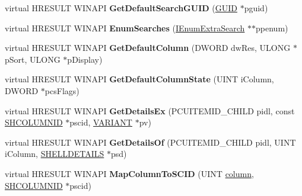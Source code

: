 \begin{DoxyCompactItemize}
\item 
\mbox{\label{class_c_network_connections_a2eb22534117599700051c3a348f8a81f}} 
virtual H\+R\+E\+S\+U\+LT W\+I\+N\+A\+PI {\bfseries Get\+Default\+Search\+G\+U\+ID} (\hyperlink{interface_g_u_i_d}{G\+U\+ID} $\ast$pguid)
\item 
\mbox{\label{class_c_network_connections_acb6d8d99a9da6bae3c8c315f125d2248}} 
virtual H\+R\+E\+S\+U\+LT W\+I\+N\+A\+PI {\bfseries Enum\+Searches} (\hyperlink{interface_i_enum_extra_search}{I\+Enum\+Extra\+Search} $\ast$$\ast$ppenum)
\item 
\mbox{\label{class_c_network_connections_a2db491cecdedf3c137fb352b8458e332}} 
virtual H\+R\+E\+S\+U\+LT W\+I\+N\+A\+PI {\bfseries Get\+Default\+Column} (D\+W\+O\+RD dw\+Res, U\+L\+O\+NG $\ast$p\+Sort, U\+L\+O\+NG $\ast$p\+Display)
\item 
\mbox{\label{class_c_network_connections_ad491907813d94ab27740f8f11208d696}} 
virtual H\+R\+E\+S\+U\+LT W\+I\+N\+A\+PI {\bfseries Get\+Default\+Column\+State} (U\+I\+NT i\+Column, D\+W\+O\+RD $\ast$pcs\+Flags)
\item 
\mbox{\label{class_c_network_connections_a1f79a0bfd284303124504a3eb76a4670}} 
virtual H\+R\+E\+S\+U\+LT W\+I\+N\+A\+PI {\bfseries Get\+Details\+Ex} (P\+C\+U\+I\+T\+E\+M\+I\+D\+\_\+\+C\+H\+I\+LD pidl, const \hyperlink{struct_i_shell_folder2_1_1_s_h_c_o_l_u_m_n_i_d}{S\+H\+C\+O\+L\+U\+M\+N\+ID} $\ast$pscid, \hyperlink{structtag_v_a_r_i_a_n_t}{V\+A\+R\+I\+A\+NT} $\ast$pv)
\item 
\mbox{\label{class_c_network_connections_a157eda2ea1aba93cd31f5bb7a543dfeb}} 
virtual H\+R\+E\+S\+U\+LT W\+I\+N\+A\+PI {\bfseries Get\+Details\+Of} (P\+C\+U\+I\+T\+E\+M\+I\+D\+\_\+\+C\+H\+I\+LD pidl, U\+I\+NT i\+Column, \hyperlink{struct_s_h_e_l_l_d_e_t_a_i_l_s}{S\+H\+E\+L\+L\+D\+E\+T\+A\+I\+LS} $\ast$psd)
\item 
\mbox{\label{class_c_network_connections_a9a985402e2b089f4907d05cac5ef9e21}} 
virtual H\+R\+E\+S\+U\+LT W\+I\+N\+A\+PI {\bfseries Map\+Column\+To\+S\+C\+ID} (U\+I\+NT \hyperlink{structcolumn}{column}, \hyperlink{struct_i_shell_folder2_1_1_s_h_c_o_l_u_m_n_i_d}{S\+H\+C\+O\+L\+U\+M\+N\+ID} $\ast$pscid)
$$
\end{DoxyCompactItemize}

